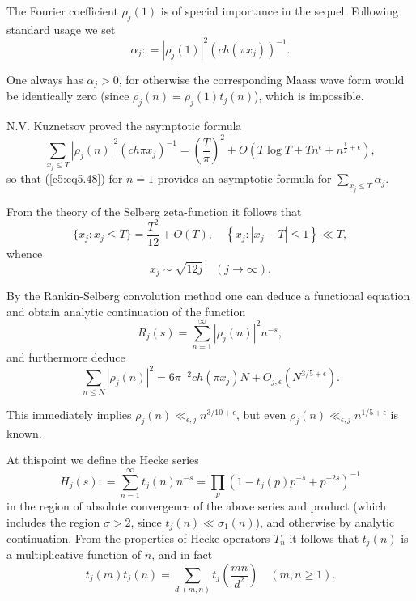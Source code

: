 The Fourier coefficient $\rho_j(1)$ is of special importance in the
sequel. Following standard usage we set 
$$
\alpha_j : = |\rho_j (1)|^2 (ch (\pi x_j))^{-1}.
$$

One always has $\alpha_j > 0$, for otherwise the corresponding Maass
wave form would be identically zero (since $\rho_j(n) = \rho_j(1)
t_j(n)$), which is impossible. 

N.V. Kuznetsov proved the asymptotic formula
\begin{equation}
\sum\limits_{x_j \leq T} |\rho_j (n)|^2 (ch \pi x_j)^{-1} =
\left(\frac{T}{\pi} \right)^2 + O \left(T \log T + T n^{\epsilon} +
n^{\frac{1}{2} + \epsilon}\right),\label{c5:eq5.48} 
\end{equation}
so that (\ref{c5:eq5.48}) for $n=1$ provides an asymptotic formula for
$\sum\limits_{x_j \leq T} \alpha_j$.  

From the theory of the Selberg zeta-function it follows that 
\begin{equation}
\{x_j : x_j \leq T\} = \frac{T^2}{12} + O(T), \quad \left\{x_j : |x_j -
T| \leq 1 \right\} \ll T, \label{c5:eq5.49} 
\end{equation}
whence 
$$
x_j \sim \sqrt{12j} \quad (j \to \infty).
$$

By the Rankin-Selberg convolution method one can deduce a functional
equation and obtain analytic continuation of the function 
$$
R_j(s)= \sum\limits^\infty_{n=1} |\rho_j (n)|^2 n^{-s},
$$
and furthermore deduce
\begin{equation}
\sum\limits_{n \leq N} |\rho_j(n)|^2  = 6 \pi^{-2} ch (\pi x_j)N +
O_{j,\epsilon} (N^{3/5 + \epsilon}).\label{c5:eq5.50} 
\end{equation}

This immediately implies $\rho_j(n) \ll_{\epsilon, j} n^{3/10 +
  \epsilon}$, but even $\rho_j(n) \ll_{\epsilon, j} n^{1/5 +
  \epsilon}$ is known. 

At this\pageoriginale point we define the Hecke series
\begin{equation}
H_j(s) : = \sum\limits^\infty_{n=1} t_j(n) n^{-s} = \prod\limits_p
\left(1-t_j(p)p^{-s} + p^{-2s}\right)^{-1}\label{c5:eq5.51} 
\end{equation}
in the region of absolute convergence of the above series and product
(which includes the region $\sigma > 2$, since $t_j(n) \ll \sigma_1
(n)$), and otherwise by analytic continuation. From the properties of
Hecke operators $T_n$ it follows that $t_j(n)$ is a multiplicative
function of $n$, and in fact 
\begin{equation}
t_j(m) t_j(n) = \sum\limits_{d|(m,n)} t_j \left(\frac{mn}{d^2} \right)
\quad (m,n \geq 1). \label{c5:eq5.52}
\end{equation}


